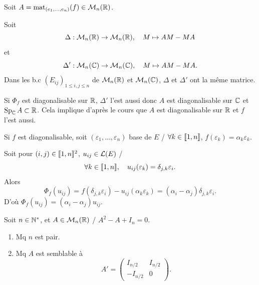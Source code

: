 \begin{solution}
Soit $A=\operatorname{mat}_{(e_1,\dots,e_n)}(f)\in\mathcal M_n(\mathbb R)$.

Soit
\[
\Delta:\mathcal M_n(\mathbb R)\to\mathcal M_n(\mathbb R),\quad M\mapsto AM-MA
\]
et
\[
\Delta':\mathcal M_n(\mathbb C)\to\mathcal M_n(\mathbb C),\quad M\mapsto AM-MA.
\]
Dans les b.c $(E_{ij})_{1\leq i,j\leq n}$ de $\mathcal M_n(\mathbb R)$ et $\mathcal M_n(\mathbb C)$,
$\Delta$ et $\Delta'$ ont la même matrice.

Si $\Phi_f$ est diagonalisable sur $\mathbb R$, $\Delta'$ l'est aussi donc $A$ est
diagonalisable sur $\mathbb C$ et $\operatorname{Sp}_\mathbb C A\subset\mathbb R$. Cela implique d'après le cours
que $A$ est diagonalisable sur $\mathbb R$ et $f$ l'est aussi.

\begin{remarkbox}
Si $f$ est diagonalisable, soit $(\varepsilon_1,\dots,\varepsilon_n)$ base
de $E$ / $\forall k\in\llbracket 1,n\rrbracket$, $f(\varepsilon_k)=\alpha_k\varepsilon_k$.

Soit pour $(i,j)\in\llbracket 1,n\rrbracket^2$, $u_{ij}\in\mathcal L(E)$ /
\[
\forall k\in\llbracket 1,n\rrbracket,\quad u_{ij}(\varepsilon_k)=\delta_{j,k}\varepsilon_i.
\]
Alors
\[
\Phi_f(u_{ij})=f(\delta_{j,k}\varepsilon_i)-u_{ij}(\alpha_k\varepsilon_k)
=(\alpha_i-\alpha_j)\delta_{j,k}\varepsilon_i.
\]
D'où $\Phi_f(u_{ij})=(\alpha_i-\alpha_j)u_{ij}$.
\end{remarkbox}
\end{solution}


\begin{statementbox}
Soit $n\in\mathbb N^*$, et $A\in\mathcal M_n(\mathbb R)$ / $A^2-A+I_n=0$.
\begin{enumerate}[label=\alph*)]
  \item Mq $n$ est pair.
  \item Mq $A$ est semblable à
  \[
  A'=\begin{pmatrix}I_{n/2}&I_{n/2}\\-I_{n/2}&0\end{pmatrix}.
  \]
\end{enumerate}
\end{statementbox}


